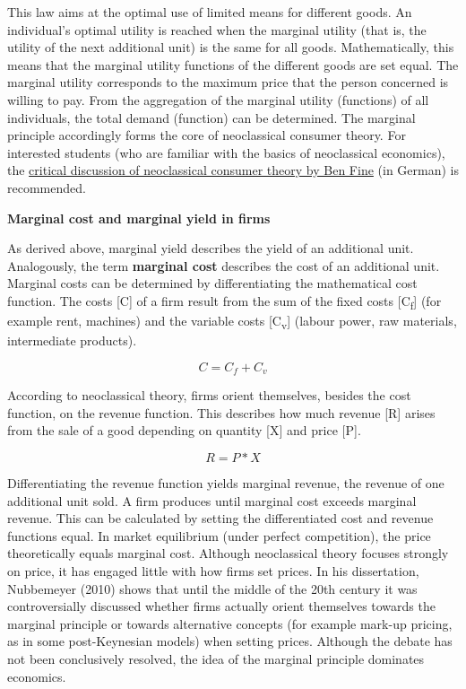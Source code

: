 \documentclass[
  british,
  a4paper,
  DIV=11,
  numbers=noendperiod,
  oneside,
  openany]{scrreprt}
\begin{document}
\begin{tcolorbox}
This law aims at the optimal use of limited means for different goods.
An individual's optimal utility is reached when the marginal utility
(that is, the utility of the next additional unit) is the same for all
goods. Mathematically, this means that the marginal utility functions of
the different goods are set equal. The marginal utility corresponds to
the maximum price that the person concerned is willing to pay. From the
aggregation of the marginal utility (functions) of all individuals, the
total demand (function) can be determined. The marginal principle
accordingly forms the core of neoclassical consumer theory. For
interested students (who are familiar with the basics of neoclassical
economics), the \href{https://ilias.unibe.ch/go/file/3803482}{critical
discussion of neoclassical consumer theory by Ben Fine} (in German) is
recommended.

\textbf{Marginal cost and marginal yield in firms}

As derived above, marginal yield describes the yield of an additional
unit. Analogously, the term \textbf{marginal cost} describes the cost of
an additional unit. Marginal costs can be determined by differentiating
the mathematical cost function. The costs {[}C{]} of a firm result from
the sum of the fixed costs {[}C\textsubscript{f}{]} (for example rent,
machines) and the variable costs {[}C\textsubscript{v}{]} (labour power,
raw materials, intermediate products).

\[C = C_f + C_v\]

According to neoclassical theory, firms orient themselves, besides the
cost function, on the revenue function. This describes how much revenue
{[}R{]} arises from the sale of a good depending on quantity {[}X{]} and
price {[}P{]}.

\[R = P * X\]

Differentiating the revenue function yields marginal revenue, the
revenue of one additional unit sold. A firm produces until marginal cost
exceeds marginal revenue. This can be calculated by setting the
differentiated cost and revenue functions equal. In market equilibrium
(under perfect competition), the price theoretically equals marginal
cost. Although neoclassical theory focuses strongly on price, it has
engaged little with how firms set prices. In his dissertation,
Nubbemeyer (2010) shows that until the middle of the 20th century it was
controversially discussed whether firms actually orient themselves
towards the marginal principle or towards alternative concepts (for
example mark-up pricing, as in some post-Keynesian models) when setting
prices. Although the debate has not been conclusively resolved, the idea
of the marginal principle dominates economics.

\end{tcolorbox}
\end{document}
